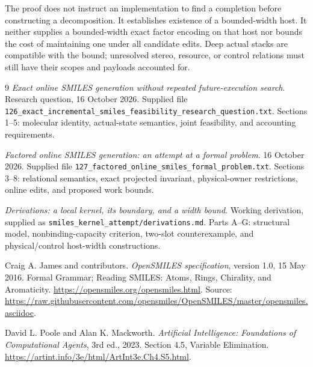 \documentclass[11pt,a4paper]{article}
\begin{document}
The proof does not instruct an implementation to find a completion before
constructing a decomposition. It establishes existence of a bounded-width host.
It neither supplies a bounded-width exact factor encoding on that host nor
bounds the cost of maintaining one under all candidate edits. Deep actual
stacks are compatible with the bound; unresolved stereo, resource, or control
relations must still have their scopes and payloads accounted for.

\begin{thebibliography}{9}
\small
{}
\emph{Exact online SMILES generation without repeated future-execution search}.
Research question, 16 October 2026. Supplied file
\texttt{126\_exact\_incremental\_smiles\_feasibility\_research\_question.txt}.
Sections 1--5: molecular identity, actual-state semantics, joint feasibility,
and accounting requirements.

\emph{Factored online SMILES generation: an attempt at a formal problem}.
16 October 2026. Supplied file
\texttt{127\_factored\_online\_smiles\_formal\_problem.txt}.
Sections 3--8: relational semantics, exact projected invariant, physical-owner
restrictions, online edits, and proposed work bounds.

\emph{Derivations: a local kernel, its boundary, and a width bound}.
Working derivation, supplied as \texttt{smiles\_kernel\_attempt/derivations.md}.
Parts A--G: structural model, nonbinding-capacity criterion, two-slot
counterexample, and physical/control host-width constructions.

Craig A. James and contributors.
\emph{OpenSMILES specification}, version 1.0, 15 May 2016.
Formal Grammar; Reading SMILES: Atoms, Rings, Chirality, and Aromaticity.
\url{https://opensmiles.org/opensmiles.html}.
Source: \url{https://raw.githubusercontent.com/opensmiles/OpenSMILES/master/opensmiles.asciidoc}.

David L. Poole and Alan K. Mackworth.
\emph{Artificial Intelligence: Foundations of Computational Agents},
3rd ed., 2023. Section 4.5, Variable Elimination.
\url{https://artint.info/3e/html/ArtInt3e.Ch4.S5.html}.
\end{thebibliography}
\end{document}
